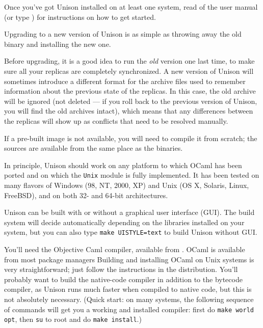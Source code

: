 \documentclass{article}
\begin{document}

Once you've got Unison installed on at least one system, read 
 of the user manual (or type ) for instructions on how to get started.



Upgrading to a new version of Unison is as simple as throwing away the old
binary and installing the new one.

Before upgrading, it is a good idea to run the {\em old} version one last
time, to make sure all your replicas are completely synchronized.  A new
version of Unison will sometimes introduce a different format for the
archive files used to remember information about the previous state of the
replicas.  In this case, the old archive will be ignored (not deleted --- if
you roll back to the previous version of Unison, you will find the old
archives intact), which means that any differences between the replicas will
show up as conflicts that need to be resolved manually.



If a pre-built image is not available, you will need to compile it from
scratch; the sources are available from the same place as the binaries.

In principle, Unison should work on any platform to which OCaml has been
ported and on which the \verb|Unix| module is fully implemented.  It has
been tested on many flavors of Windows (98, NT, 2000, XP) and Unix (OS X,
Solaris, Linux, FreeBSD), and on both 32- and 64-bit architectures.



Unison can be built with or without a graphical user interface (GUI). The
build system will decide automatically depending on the libraries installed
on your system, but you can also type {\tt make UISTYLE=text} to build
Unison without GUI.

You'll need the Objective Caml compiler, 
available from .  OCaml is available from most
package managers 
Building and installing OCaml
on Unix systems is very straightforward; just follow the instructions in the
distribution.  You'll probably want to build the native-code compiler in
addition to the bytecode compiler, as Unison runs much faster when compiled
to native code, but this is not absolutely necessary.
%
(Quick start: on many systems, the following sequence of commands will
get you a working and installed compiler: first do {\tt make world opt},
then {\tt su} to root and do {\tt make install}.)
\end{document}
